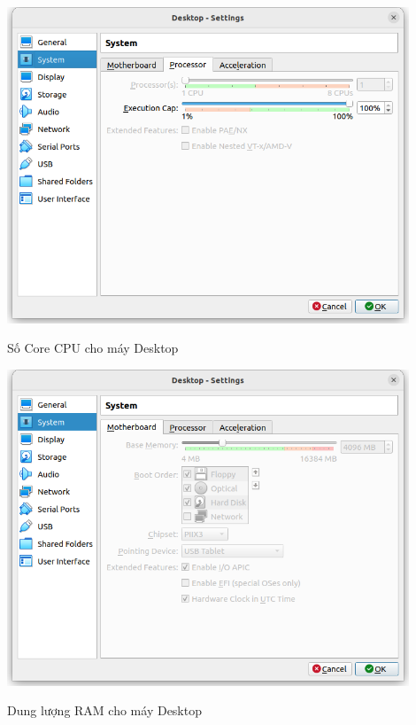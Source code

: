 \documentclass[a4paper, 11pt]{article}
\begin{document}
\begin{itemize}
\begin{enumerate}
                    \begin{minipage}
                        {\linewidth}
                        \captionsetup{type=figure}
                        \centering
                        \includegraphics[width=12cm]{images/desktop-processor.png}
                        \caption{Số Core CPU cho máy Desktop}
                        \label{desktop-processor}
                    \end{minipage}

                    \begin{minipage}
                        {\linewidth}
                        \captionsetup{type=figure}
                        \centering
                        \includegraphics[width=12cm]{images/desktop-ram.png}
                        \caption{Dung lượng RAM cho máy Desktop}
                        \label{desktop-ram}
                    \end{minipage}


\end{enumerate}
\end{itemize}
\end{document}
